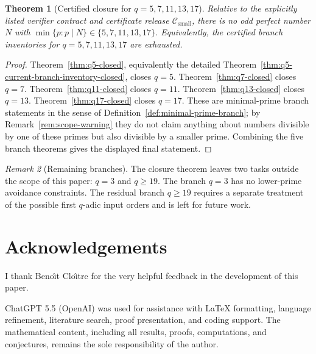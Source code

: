 \documentclass[11pt]{article}
\newtheorem{theorem}{Theorem}[section]
\theoremstyle{definition}
\theoremstyle{remark}
\newtheorem{remark}[theorem]{Remark}
\newcommand{\Csmall}{\ensuremath{\mathcal C_{\mathrm{small}}}}
\begin{document}
\begin{theorem}[Certified closure for \(q=5,7,11,13,17\)]
\label{thm:final-closure}
Relative to the explicitly listed verifier contract and certificate release
\(\Csmall\), there is no odd perfect number \(N\) with
\(\min\{p:p\mid N\}\in\{5,7,11,13,17\}\).  Equivalently, the certified branch
inventories for \(q=5,7,11,13,17\) are exhausted.
\end{theorem}

\begin{proof}
Theorem~\ref{thm:q5-closed}, equivalently the detailed
Theorem~\ref{thm:q5-current-branch-inventory-closed}, closes \(q=5\).
Theorem~\ref{thm:q7-closed} closes \(q=7\).
Theorem~\ref{thm:q11-closed} closes \(q=11\).  Theorem~\ref{thm:q13-closed}
closes \(q=13\).  Theorem~\ref{thm:q17-closed} closes \(q=17\).
These are minimal-prime branch statements in the sense of
Definition~\ref{def:minimal-prime-branch}; by Remark~\ref{rem:scope-warning}
they do not claim anything about numbers divisible by one of these primes but
also divisible by a smaller prime.  Combining the five branch theorems gives
the displayed final statement.
\end{proof}

\begin{remark}[Remaining branches]
The closure theorem leaves two tasks outside the scope of this paper: \(q=3\)
and \(q\ge19\).
The branch \(q=3\) has no lower-prime avoidance constraints.  The residual
branch \(q\ge19\) requires a separate treatment of the possible first
\(q\)-adic input orders and is left for future work.
\end{remark}

\section*{Acknowledgements}

I thank Beno\^{\i}t Clo\^{\i}tre for the very helpful feedback in the development of this paper.

ChatGPT 5.5 (OpenAI) was used for assistance with LaTeX formatting,
language refinement, literature search, proof presentation, and coding support.
The mathematical content, including all results, proofs, computations, and
conjectures, remains the sole responsibility of the author.

\nocite{*}
\FloatBarrier


\end{document}
